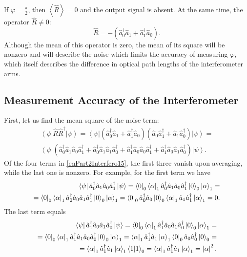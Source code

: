 If $\varphi = \frac{\pi}{2}$, then $\left<\hat{R}\right> = 0$ and
the output signal is absent. At the same time, the operator $\hat{R} \ne 0$:
\[
\hat{R} = 
-
\left(
\hat{a}_0^{\dag} \hat{a}_1 + 
\hat{a}_1^{\dag} \hat{a}_0
\right).
\]
Although the mean of this operator is zero, the mean of its square will
be nonzero and will describe the noise which limits the accuracy
of measuring $\varphi$, which itself describes the difference
in optical path lengths of the interferometer arms.

\subsection{Measurement Accuracy of the Interferometer}

First, let us find the mean square of the noise term:
\begin{eqnarray}
\left<\psi\right|\hat{R}\hat{R}^{\dag}\left|\psi\right> = 
\left<\psi\right|
\left(
\hat{a}_0^{\dag} \hat{a}_1 + 
\hat{a}_1^{\dag} \hat{a}_0
\right)
\left(
\hat{a}_0 \hat{a}_1^{\dag} +
\hat{a}_1 \hat{a}_0^{\dag}
\right)
\left|\psi\right> = 
\nonumber \\
\left<\psi\right|
\left(
\hat{a}_0^{\dag} \hat{a}_1 
\hat{a}_0 \hat{a}_1^{\dag} 
+ 
\hat{a}_0^{\dag} \hat{a}_1 
\hat{a}_1 \hat{a}_0^{\dag}
+
\hat{a}_1^{\dag} \hat{a}_0
\hat{a}_0 \hat{a}_1^{\dag} 
+
\hat{a}_1^{\dag} \hat{a}_0
\hat{a}_1 \hat{a}_0^{\dag}
\right)
\left|\psi\right>.
\label{eqPart2Interfero15}
\end{eqnarray}
Of the four terms in \eqref{eqPart2Interfero15}, the first three vanish upon averaging, while the last one is nonzero.
For example, for the first term we have
\begin{eqnarray}
\left<\psi\right|
\hat{a}_0^{\dag} \hat{a}_1 
\hat{a}_0 \hat{a}_1^{\dag} 
\left|\psi\right> = 
\bra{0}_0\left<\alpha\right|_1
\hat{a}_0^{\dag} \hat{a}_1 
\hat{a}_0 \hat{a}_1^{\dag} 
\ket{0}_0\left|\alpha\right>_1 =
\nonumber \\
=
\bra{0}_0\left<\alpha\right|_1
\hat{a}_0^{\dag} \hat{a}_0 
\hat{a}_1 \hat{a}_1^{\dag} 
\ket{0}_0\left|\alpha\right>_1 =
\bra{0}_0
\hat{a}_0^{\dag} \hat{a}_0 
\ket{0}_0
\left<\alpha\right|_1
\hat{a}_1 \hat{a}_1^{\dag} 
\left|\alpha\right>_1 =
0.
\nonumber
\end{eqnarray}
The last term equals
\begin{eqnarray}
\left<\psi\right|
\hat{a}_1^{\dag} \hat{a}_0
\hat{a}_1 \hat{a}_0^{\dag}
\left|\psi\right> = 
\bra{0}_0\left<\alpha\right|_1
\hat{a}_1^{\dag} \hat{a}_0
\hat{a}_1 \hat{a}_0^{\dag}
\ket{0}_0\left|\alpha\right>_1 =
\nonumber \\
=
\bra{0}_0\left<\alpha\right|_1
\hat{a}_1^{\dag} \hat{a}_1 
\hat{a}_0 \hat{a}_0^{\dag}
\ket{0}_0\left|\alpha\right>_1 =
\left<\alpha\right|_1
\hat{a}_1^{\dag} \hat{a}_1 
\left|\alpha\right>_1 
\bra{0}_0
\hat{a}_0 \hat{a}_0^{\dag}
\ket{0}_0 =
\nonumber \\
=
\left<\alpha\right|_1
\hat{a}_1^{\dag} \hat{a}_1 
\left|\alpha\right>_1 
\bra{1}
\ket{1}_0 =
\left<\alpha\right|_1
\hat{a}_1^{\dag} \hat{a}_1 
\left|\alpha\right>_1 
= \left|\alpha\right|^2.
\end{eqnarray}
